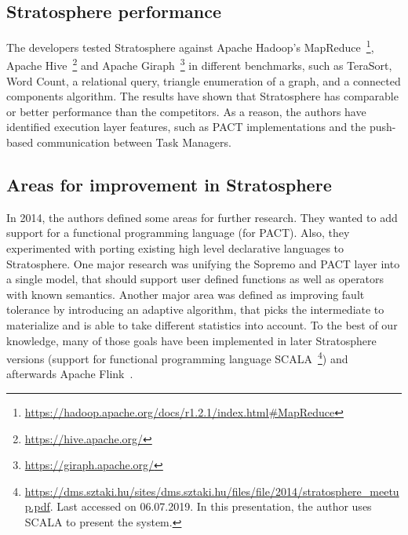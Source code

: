 \subsection{Stratosphere performance}\label{straotspherePerformance}
The developers tested Stratosphere against Apache Hadoop's MapReduce~\footnote{\url{https://hadoop.apache.org/docs/r1.2.1/index.html#MapReduce}}, Apache Hive~\footnote{\url{https://hive.apache.org/}} and Apache Giraph~\footnote{\url{https://giraph.apache.org/}} in different benchmarks, such as TeraSort, Word Count, a relational query, triangle enumeration of a graph, and a connected components algorithm. The results have shown that Stratosphere has comparable or better performance than the competitors. As a reason, the authors have identified execution layer features, such as PACT implementations and the push-based communication between Task Managers.

\subsection{Areas for improvement in Stratosphere}\label{stratosphereImprovement}
In 2014, the authors defined some areas for further research. They wanted to add support for a functional programming language (for PACT). Also, they experimented with porting existing high level declarative languages to Stratosphere. One major research was unifying the Sopremo and PACT layer into a single model, that should support user defined functions as well as operators with known semantics. Another major area was defined as improving fault tolerance by introducing an adaptive algorithm, that picks the intermediate to materialize and is able to take different statistics into account. To the best of our knowledge, many of those goals have been implemented in later Stratosphere versions (support for functional programming language SCALA~\footnote{\url{https://dms.sztaki.hu/sites/dms.sztaki.hu/files/file/2014/stratosphere_meetup.pdf}. Last accessed on 06.07.2019. In this presentation, the author uses SCALA to present the system.}) and afterwards Apache Flink~\cite{Flink2015}.